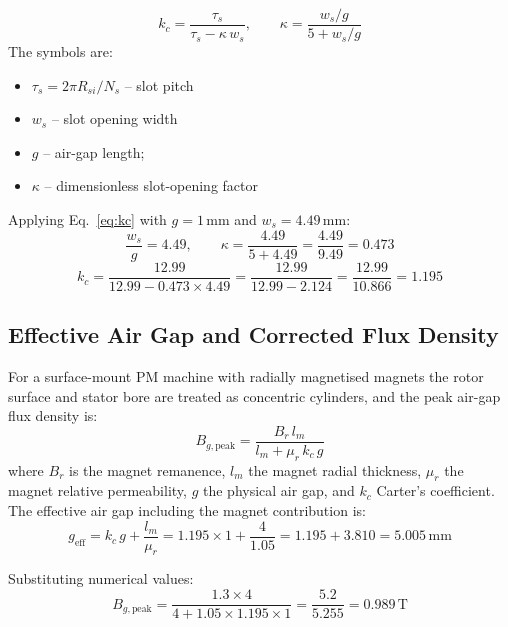 \documentclass[12pt,a4paper]{article}
\newcommand{\unit}[1]{\ensuremath{\,\mathrm{#1}}}
\begin{document}
\begin{equation}
  k_c = \frac{\tau_s}{\tau_s - \kappa\,w_s},
  \qquad
  \kappa = \frac{w_s/g}{5 + w_s/g}
  \label{eq:kc}
\end{equation}
The symbols are:
\begin{itemize}[noitemsep]
  \item $\tau_s = 2\pi R_{si}/N_s$ -- slot pitch
  \item $w_s$ -- slot opening width
  \item $g$ -- air-gap length;
  \item $\kappa$ -- dimensionless slot-opening factor
\end{itemize}

Applying Eq.~\eqref{eq:kc} with $g = 1\unit{mm}$ and $w_s = 4.49\unit{mm}$:
\begin{equation}
  \frac{w_s}{g} = 4.49,
  \qquad
  \kappa = \frac{4.49}{5 + 4.49} = \frac{4.49}{9.49} = 0.473
\end{equation}
\begin{equation}
  k_c = \frac{12.99}{12.99 - 0.473 \times 4.49}
      = \frac{12.99}{12.99 - 2.124}
      = \frac{12.99}{10.866}
      = \mathbf{1.195}
\end{equation}

\subsection{Effective Air Gap and Corrected Flux Density}

For a surface-mount PM machine with radially magnetised magnets the rotor
surface and stator bore are treated as concentric cylinders, and the peak
air-gap flux density is:
\begin{equation}
  B_{g,\text{peak}} = \frac{B_r \, l_m}{l_m + \mu_r \, k_c \, g}
  \label{eq:Bg}
\end{equation}
where $B_r$ is the magnet remanence, $l_m$ the magnet radial thickness,
$\mu_r$ the magnet relative permeability, $g$ the physical air gap, and
$k_c$ Carter's coefficient.
The effective air gap including the magnet contribution is:
\begin{equation}
  g_{\text{eff}} = k_c\,g + \frac{l_m}{\mu_r}
                 = 1.195 \times 1 + \frac{4}{1.05}
                 = 1.195 + 3.810 = 5.005\unit{mm}
\end{equation}

Substituting numerical values:
\begin{equation}
  B_{g,\text{peak}} = \frac{1.3 \times 4}{4 + 1.05 \times 1.195 \times 1}
                    = \frac{5.2}{5.255} = \mathbf{0.989\unit{T}}
\end{equation}
\end{document}
